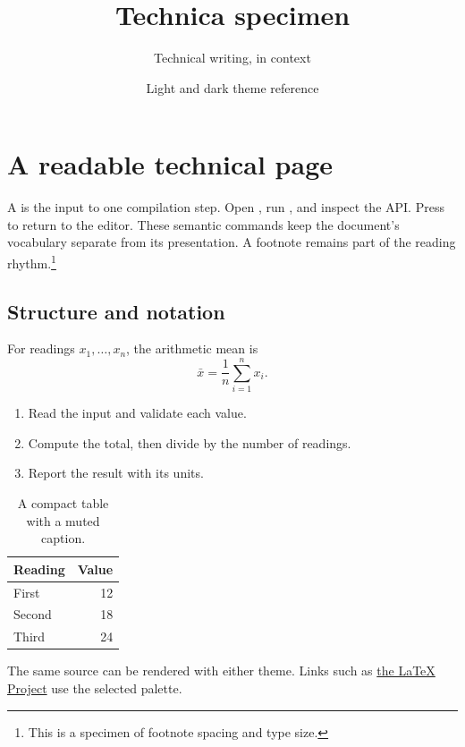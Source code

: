\documentclass[11pt]{article}
\title{Technica specimen}
\author{Technical writing, in context}
\date{Light and dark theme reference}
\begin{document}
\maketitle

\section{A readable technical page}
A  is the input to one compilation step. Open
, run , and inspect the
 API. Press  to return to the editor.
These semantic commands keep the document's vocabulary separate from its
presentation. A footnote remains part of the reading rhythm.\footnote{This is
a specimen of footnote spacing and type size.}

\subsection{Structure and notation}
For readings $x_1,\ldots,x_n$, the arithmetic mean is
\[
    \bar{x} = \frac{1}{n}\sum_{i=1}^{n} x_i.
\]
\begin{enumerate}
\item Read the input and validate each value.
\item Compute the total, then divide by the number of readings.
\item Report the result with its units.
\end{enumerate}

\begin{table}[h]
\centering
\begin{tabular}{lr}
\hline
Reading & Value \\
\hline
First & 12 \\
Second & 18 \\
Third & 24 \\
\hline
\end{tabular}
\caption{A compact table with a muted caption.}
\end{table}

\begin{note}
The same source can be rendered with either theme. Links such as
\href{https://www.latex-project.org/}{the LaTeX Project} use the selected palette.
\end{note}

\newpage
\end{document}
